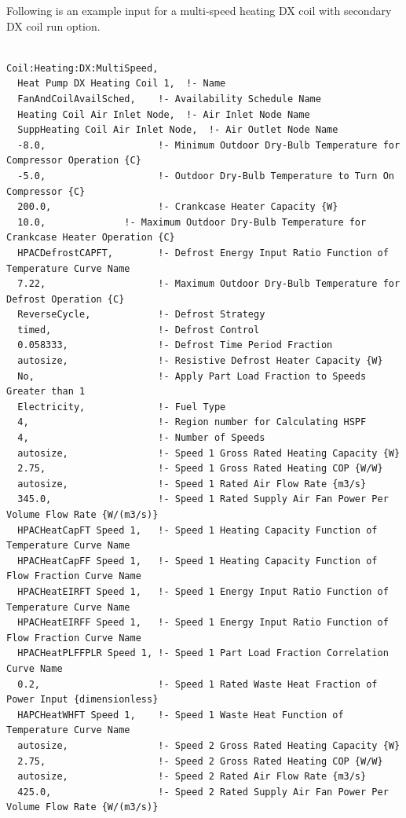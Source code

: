 Following is an example input for a multi-speed heating DX coil with secondary DX coil run option.

\begin{lstlisting}

Coil:Heating:DX:MultiSpeed,
  Heat Pump DX Heating Coil 1,  !- Name
  FanAndCoilAvailSched,    !- Availability Schedule Name
  Heating Coil Air Inlet Node,  !- Air Inlet Node Name
  SuppHeating Coil Air Inlet Node,  !- Air Outlet Node Name
  -8.0,                    !- Minimum Outdoor Dry-Bulb Temperature for Compressor Operation {C}
  -5.0,                    !- Outdoor Dry-Bulb Temperature to Turn On Compressor {C}
  200.0,                   !- Crankcase Heater Capacity {W}
  10.0,              !- Maximum Outdoor Dry-Bulb Temperature for Crankcase Heater Operation {C}
  HPACDefrostCAPFT,        !- Defrost Energy Input Ratio Function of Temperature Curve Name
  7.22,                    !- Maximum Outdoor Dry-Bulb Temperature for Defrost Operation {C}
  ReverseCycle,            !- Defrost Strategy
  timed,                   !- Defrost Control
  0.058333,                !- Defrost Time Period Fraction
  autosize,                !- Resistive Defrost Heater Capacity {W}
  No,                      !- Apply Part Load Fraction to Speeds Greater than 1
  Electricity,             !- Fuel Type
  4,                       !- Region number for Calculating HSPF
  4,                       !- Number of Speeds
  autosize,                !- Speed 1 Gross Rated Heating Capacity {W}
  2.75,                    !- Speed 1 Gross Rated Heating COP {W/W}
  autosize,                !- Speed 1 Rated Air Flow Rate {m3/s}
  345.0,                   !- Speed 1 Rated Supply Air Fan Power Per Volume Flow Rate {W/(m3/s)}
  HPACHeatCapFT Speed 1,   !- Speed 1 Heating Capacity Function of Temperature Curve Name
  HPACHeatCapFF Speed 1,   !- Speed 1 Heating Capacity Function of Flow Fraction Curve Name
  HPACHeatEIRFT Speed 1,   !- Speed 1 Energy Input Ratio Function of Temperature Curve Name
  HPACHeatEIRFF Speed 1,   !- Speed 1 Energy Input Ratio Function of Flow Fraction Curve Name
  HPACHeatPLFFPLR Speed 1, !- Speed 1 Part Load Fraction Correlation Curve Name
  0.2,                     !- Speed 1 Rated Waste Heat Fraction of Power Input {dimensionless}
  HAPCHeatWHFT Speed 1,    !- Speed 1 Waste Heat Function of Temperature Curve Name
  autosize,                !- Speed 2 Gross Rated Heating Capacity {W}
  2.75,                    !- Speed 2 Gross Rated Heating COP {W/W}
  autosize,                !- Speed 2 Rated Air Flow Rate {m3/s}
  425.0,                   !- Speed 2 Rated Supply Air Fan Power Per Volume Flow Rate {W/(m3/s)}

\end{lstlisting}
